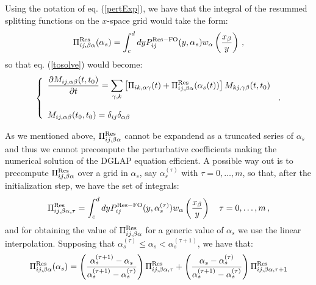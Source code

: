 \documentclass[10pt,a4paper]{article}
\begin{document}
Using the notation of eq. (\ref{pertExp}), we have that the integral of
the resummed splitting functions on the $x$-space grid would take the form:
\begin{equation}
\Pi_{ij,\beta\alpha}^{\rm Res}(\alpha_s) = \int^{d}_{c}dy{P}_{ij}^{\rm Res-FO}(y,\alpha_s)w_{\alpha}\left(\frac{x_\beta}{y}\right)\,,
\end{equation}
so that eq. (\ref{tosolve}) would become:
\begin{equation}
\left\{\begin{array}{l}
\displaystyle \frac{\partial  M_{ij,\alpha\beta}(t,t_0)}{\partial t}=\sum_{\gamma,k} \left[\Pi_{ik,\alpha\gamma}(t)+\Pi_{ij,\beta\alpha}^{\rm Res}(\alpha_s(t))\right]M_{kj,\gamma\beta}(t,t_0)\\
\\
\displaystyle M_{ij,\alpha\beta}(t_0,t_0)=\delta_{ij}\delta_{\alpha\beta}
\end{array}\right.\,.
\label{tosolveRes}
\end{equation}

As we mentioned above, $\Pi_{ij,\beta\alpha}^{\rm Res}$ cannot be
expandend as a truncated series of $\alpha_s$ and thus we cannot
precompute the perturbative coefficients making the numerical solution
of the DGLAP equation efficient. 
A possible way out is to precompute
$\Pi_{ij,\beta\alpha}^{\rm Res}$ over a grid in $\alpha_s$, say
$\alpha_s^{(\tau)}$ with $\tau = 0,\dots,m$, so that, after the
initialization step, we have the set of integrals:
\begin{equation}
\Pi_{ij,\beta\alpha,\tau}^{\rm Res} = \int^{d}_{c}dy{P}_{ij}^{\rm
  Res-FO}(y,\alpha_s^{(\tau)})w_{\alpha}\left(\frac{x_\beta}{y}\right)\quad
\tau = 0,\dots,m\,,
\end{equation}
and for obtaining the value of $\Pi_{ij,\beta\alpha}^{\rm Res}$ for a
generic value of $\alpha_s$ we use the linear interpolation. Supposing
that $\alpha_s^{(\tau)}\leq\alpha_s<\alpha_s^{(\tau+1)}$, we have that:
\begin{equation}
\Pi_{ij,\beta\alpha}^{\rm Res}(\alpha_s) =
\left(\frac{\alpha_s^{(\tau+1)}-\alpha_s}{\alpha_s^{(\tau+1)}-\alpha_s^{(\tau)}}\right)\Pi_{ij,\beta\alpha,\tau}^{\rm Res} +\left(\frac{\alpha_s-\alpha_s^{(\tau)}}{\alpha_s^{(\tau+1)}-\alpha_s^{(\tau)}}\right)\Pi_{ij,\beta\alpha,\tau+1}^{\rm Res}
\end{equation}
\end{document}

